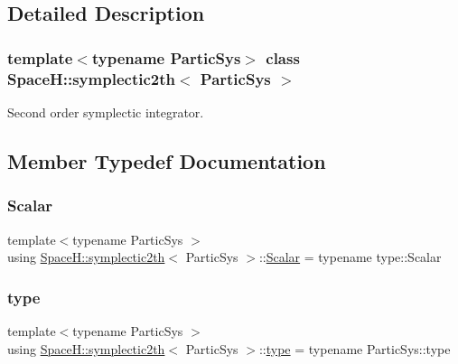 \subsection{Detailed Description}
\subsubsection*{template$<$typename Partic\+Sys$>$\newline
class Space\+H\+::symplectic2th$<$ Partic\+Sys $>$}

Second order symplectic integrator. 

\subsection{Member Typedef Documentation}
\mbox{\label{class_space_h_1_1symplectic2th_a744708fc201c6970effe4d0b011973e9}} 
\subsubsection{\texorpdfstring{Scalar}{Scalar}}
{\footnotesize\ttfamily template$<$typename Partic\+Sys $>$ \\
using \mbox{\hyperlink{class_space_h_1_1symplectic2th}{Space\+H\+::symplectic2th}}$<$ Partic\+Sys $>$\+::\mbox{\hyperlink{class_space_h_1_1symplectic2th_a744708fc201c6970effe4d0b011973e9}{Scalar}} =  typename type\+::\+Scalar}

\mbox{\label{class_space_h_1_1symplectic2th_a37bb3e82a496cf7e4ca61d0dcb1f0001}} 
\subsubsection{\texorpdfstring{type}{type}}
{\footnotesize\ttfamily template$<$typename Partic\+Sys $>$ \\
using \mbox{\hyperlink{class_space_h_1_1symplectic2th}{Space\+H\+::symplectic2th}}$<$ Partic\+Sys $>$\+::\mbox{\hyperlink{class_space_h_1_1symplectic2th_a37bb3e82a496cf7e4ca61d0dcb1f0001}{type}} =  typename Partic\+Sys\+::type}



